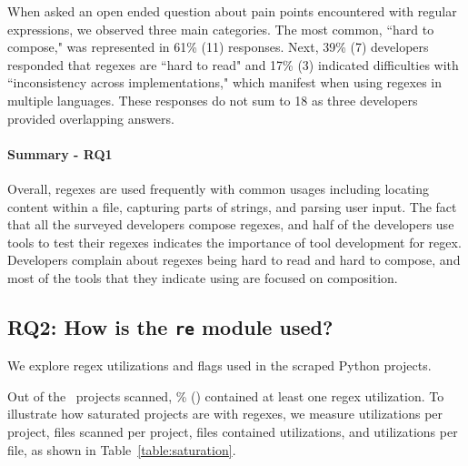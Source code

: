 When asked an open ended question about pain points encountered with regular expressions, we observed three main categories. The most common, ``hard to compose," was represented in 61\% (11) responses. Next,
 39\% (7) developers responded that regexes are ``hard to read" and 17\% (3) indicated difficulties with ``inconsistency across implementations," which manifest when using regexes in multiple languages. These responses do not sum to 18 as three developers provided overlapping  answers.

\paragraph{Summary - RQ1}

Overall, regexes are used frequently with common usages including locating content within a file, capturing parts of strings, and parsing user input.
The fact that all the surveyed developers compose regexes, and half of the developers use tools to test their regexes indicates the importance of tool development for regex.  Developers complain about regexes being hard to read and hard to compose, and most of the tools that they indicate using are focused on composition.



\subsection{RQ2: How  is the {\tt re} module used?}
We explore regex utilizations and flags used in the scraped Python projects.

Out of the \ projects scanned, \% () contained at least one regex utilization.  To illustrate how saturated projects are with regexes, we measure utilizations per project, files scanned per project, files contained utilizations, and  utilizations  per file, as shown in Table~\ref{table:saturation}.

